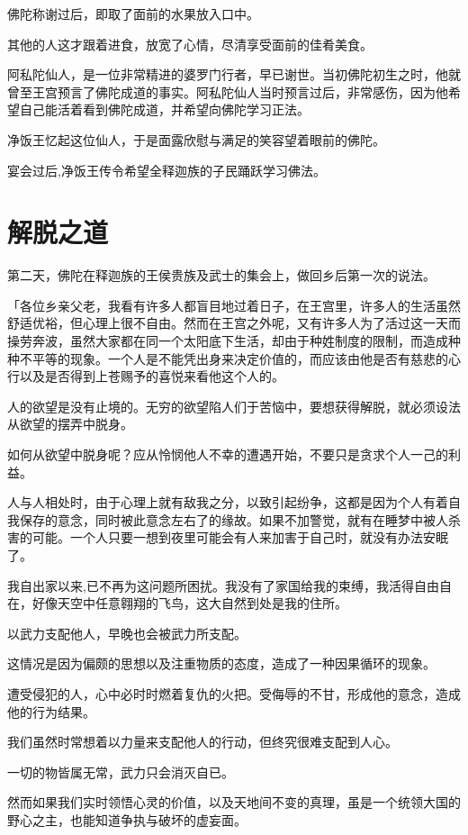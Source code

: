\documentclass[twoside,openany]{book}
\begin{document}
佛陀称谢过后，即取了面前的水果放入口中。

其他的人这才跟着进食，放宽了心情，尽清享受面前的佳肴美食。

阿私陀仙人，是一位非常精进的婆罗门行者，早已谢世。当初佛陀初生之时，他就曾至王宫预言了佛陀成道的事实。阿私陀仙人当时预言过后，非常感伤，因为他希望自己能活着看到佛陀成道，并希望向佛陀学习正法。

净饭王忆起这位仙人，于是面露欣慰与满足的笑容望着眼前的佛陀。

宴会过后,净饭王传令希望全释迦族的子民踊跃学习佛法。

\section{解脱之道}\label{sec8.4}

第二天，佛陀在释迦族的王侯贵族及武士的集会上，做回乡后第一次的说法。

「各位乡亲父老，我看有许多人都盲目地过着日子，在王宫里，许多人的生活虽然舒适优裕，但心理上很不自由。然而在王宫之外呢，又有许多人为了活过这一天而操劳奔波，虽然大家都在同一个太阳底下生活，却由于种姓制度的限制，而造成种种不平等的现象。一个人是不能凭出身来决定价值的，而应该由他是否有慈悲的心行以及是否得到上苍赐予的喜悦来看他这个人的。

人的欲望是没有止境的。无穷的欲望陷人们于苦恼中，要想获得解脱，就必须设法从欲望的摆弄中脱身。

如何从欲望中脱身呢？应从怜悯他人不幸的遭遇开始，不要只是贪求个人一己的利益。

人与人相处时，由于心理上就有敌我之分，以致引起纷争，这都是因为个人有着自我保存的意念，同时被此意念左右了的缘故。如果不加警觉，就有在睡梦中被人杀害的可能。一个人只要一想到夜里可能会有人来加害于自己时，就没有办法安眠了。

我自出家以来,已不再为这问题所困扰。我没有了家国给我的束缚，我活得自由自在，好像天空中任意翱翔的飞鸟，这大自然到处是我的住所。

以武力支配他人，早晚也会被武力所支配。

这情况是因为偏颇的思想以及注重物质的态度，造成了一种因果循环的现象。

遭受侵犯的人，心中必时时燃着复仇的火把。受侮辱的不甘，形成他的意念，造成他的行为结果。

我们虽然时常想着以力量来支配他人的行动，但终究很难支配到人心。

一切的物皆属无常，武力只会消灭自已。

然而如果我们实时领悟心灵的价值，以及天地间不变的真理，虽是一个统领大国的野心之主，也能知道争执与破坏的虚妄面。
\end{document}
